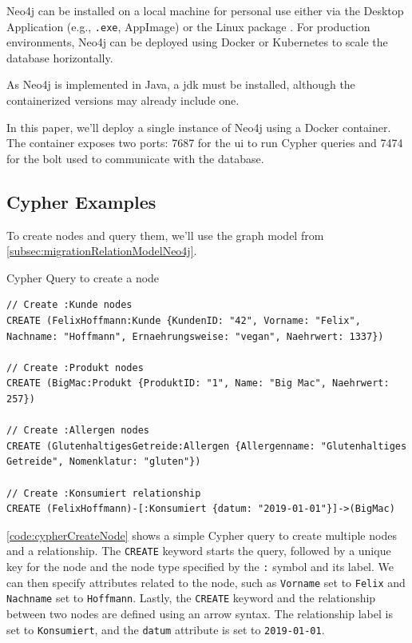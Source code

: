 Neo4j can be installed on a local machine for personal use either via the Desktop Application (e.g., \texttt{.exe}, AppImage) or the Linux package \parencite{neo4j_neo4j_nodate}. For production environments, Neo4j can be deployed using Docker \parencite{neo4j_docs_introduction_nodate} or Kubernetes to scale the database horizontally.

As Neo4j is implemented in Java, a \ac{jdk} must be installed, although the containerized versions may already include one.

In this paper, we'll deploy a single instance of Neo4j using a Docker container. The container exposes two ports: \num{7687} for the \ac{ui} to run Cypher queries and \num{7474} for the \ac{bolt} used to communicate with the database.

\subsection{Cypher Examples} \label{subsec:queryingNeo4j}

To create nodes and query them, we'll use the graph model from \autoref{subsec:migrationRelationModelNeo4j}.

\begin{code}[H]
    \caption{Cypher Query to create a node} \label{code:cypherCreateNode}
    \begin{verbatim}
// Create :Kunde nodes
CREATE (FelixHoffmann:Kunde {KundenID: "42", Vorname: "Felix", Nachname: "Hoffmann", Ernaehrungsweise: "vegan", Naehrwert: 1337})

// Create :Produkt nodes
CREATE (BigMac:Produkt {ProduktID: "1", Name: "Big Mac", Naehrwert: 257})

// Create :Allergen nodes
CREATE (GlutenhaltigesGetreide:Allergen {Allergenname: "Glutenhaltiges Getreide", Nomenklatur: "gluten"})

// Create :Konsumiert relationship
CREATE (FelixHoffmann)-[:Konsumiert {datum: "2019-01-01"}]->(BigMac)
    \end{verbatim}
\end{code}

\vspace{-\parskip}

\autoref{code:cypherCreateNode} shows a simple Cypher query to create multiple nodes and a relationship. The \texttt{CREATE} keyword starts the query, followed by a unique key for the node and the node type specified by the \texttt{:} symbol and its label. We can then specify attributes related to the node, such as \texttt{Vorname} set to \texttt{Felix} and \texttt{Nachname} set to \texttt{Hoffmann}. Lastly, the \texttt{CREATE} keyword and the relationship between two nodes are defined using an arrow syntax. The relationship label is set to \texttt{Konsumiert}, and the \texttt{datum} attribute is set to \texttt{2019-01-01}.

